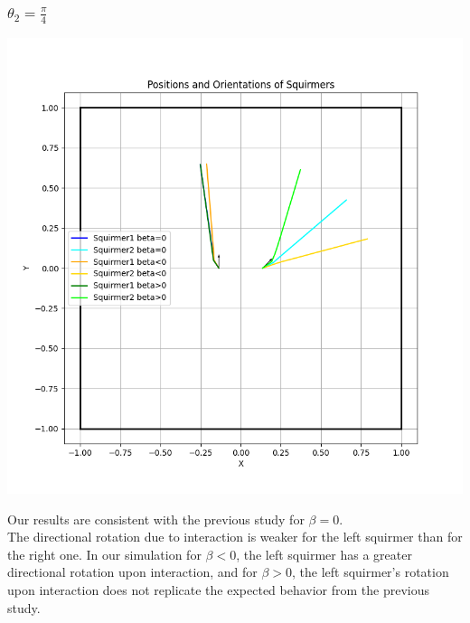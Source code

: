 \documentclass{article}
\begin{document}
\subsubsection{$\theta_2 = \frac{\pi}{4}$}
\begin{center}
   \includegraphics[width=1\textwidth]{graphs/simulations/twosquirmerinter/sq2.pi.4.png}
\end{center}
Our results are consistent with the previous study for $\beta = 0$.\\
The directional rotation due to interaction is weaker for the left squirmer than for the right one.
 In our simulation for $\beta < 0$, the left squirmer has a greater directional rotation upon interaction,
 and for $\beta > 0$, the left squirmer's rotation upon interaction does not replicate the expected behavior from the previous study.\\
\end{document}
